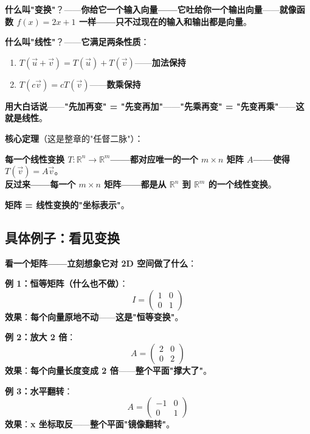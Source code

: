\textbf{什么叫"变换"}？——\textbf{你给它一个输入向量——它吐给你一个输出向量}——\textbf{就像函数 $f(x) = 2x + 1$ 一样——只不过现在的输入和输出都是向量}。

\textbf{什么叫"线性"}？——\textbf{它满足两条性质}：

\begin{enumerate}
\item \textbf{$T(\vec{u} + \vec{v}) = T(\vec{u}) + T(\vec{v})$}——\textbf{加法保持}
\item \textbf{$T(c \vec{v}) = c T(\vec{v})$}——\textbf{数乘保持}
\end{enumerate}

\textbf{用大白话说}——\textbf{"先加再变" = "先变再加"}——\textbf{"先乘再变" = "先变再乘"}——\textbf{这就是线性}。

\textbf{核心定理}（这是整章的"任督二脉"）：

\begin{tcolorbox}[essbox={矩阵的真正定义}]
\textbf{每一个线性变换 $T: \mathbb{R}^n \to \mathbb{R}^m$——都对应唯一的一个 $m \times n$ 矩阵 $A$——使得 $T(\vec{v}) = A \vec{v}$}。\\[4pt]
\textbf{反过来——每一个 $m \times n$ 矩阵——都是从 $\mathbb{R}^n$ 到 $\mathbb{R}^m$ 的一个线性变换}。
\end{tcolorbox}

\textbf{矩阵 = 线性变换的"坐标表示"}。

\subsection{具体例子：看见变换}

\textbf{看一个矩阵——立刻想象它对 2D 空间做了什么}：

\textbf{例 1：恒等矩阵（什么也不做）}：
\[
I = \begin{pmatrix} 1 & 0 \\ 0 & 1 \end{pmatrix}
\]
\textbf{效果}：\textbf{每个向量原地不动}——\textbf{这是"恒等变换"}。

\textbf{例 2：放大 2 倍}：
\[
A = \begin{pmatrix} 2 & 0 \\ 0 & 2 \end{pmatrix}
\]
\textbf{效果}：\textbf{每个向量长度变成 2 倍}——\textbf{整个平面"撑大了"}。

\textbf{例 3：水平翻转}：
\[
A = \begin{pmatrix} -1 & 0 \\ 0 & 1 \end{pmatrix}
\]
\textbf{效果}：\textbf{x 坐标取反}——\textbf{整个平面"镜像翻转"}。

